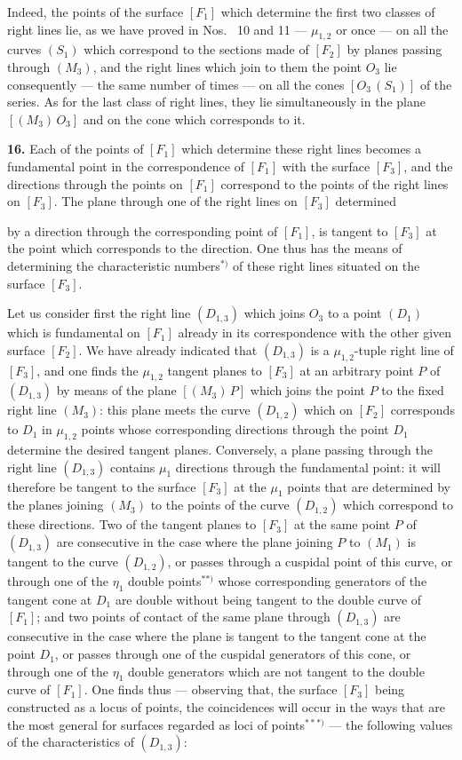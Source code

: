 \documentclass{article}
\begin{document}
Indeed, the points of the surface $[F_1]$ which determine the first two classes of right lines lie, as we have proved in Nos.~ 10 and 11 --- $\mu_{1, 2}$ or once --- on all the curves $(S_1)$ which correspond to the sections made of $[F_2]$ by planes passing through $(M_3)$, and the right lines which join to them the point $O_3$ lie consequently --- the same number of times --- on all the cones $[O_3\,(S_1)]$ of the series. As for the last class of right lines, they lie simultaneously in the plane $[(M_3)\,O_3]$ and on the cone which corresponds to it.

\textbf{16.} Each of the points of $[F_1]$ which determine these right lines becomes a fundamental point in the correspondence of $[F_1]$ with the surface $[F_3]$, and the directions through the points on $[F_1]$ correspond to the points of the right lines on $[F_3]$. The plane through one of the right lines on $[F_3]$ determined

by a direction through the corresponding point of $[F_1]$, is tangent to $[F_3]$ at the point which corresponds to the direction. One thus has the means of determining the characteristic numbers${}^{*)}$ of these right lines situated on the surface $[F_3]$.

Let us consider first the right line $(D_{1, 3})$ which joins $O_3$ to a point $(D_1)$ which is fundamental on $[F_1]$ already in its correspondence with the other given surface $[F_2]$. We have already indicated that $(D_{1, 3})$ is a $\mu_{1, 2}$-tuple right line of $[F_3]$, and one finds the $\mu_{1, 2}$ tangent planes to $[F_3]$ at an arbitrary point $P$ of $(D_{1, 3})$ by means of the plane $[(M_3)\,P]$ which joins the point $P$ to the fixed right line $(M_3)$: this plane meets the curve $(D_{1, 2})$ which on $[F_2]$ corresponds to $D_1$ in $\mu_{1, 2}$ points whose corresponding directions through the point $D_1$ determine the desired tangent planes. Conversely, a plane passing through the right line $(D_{1, 3})$ contains $\mu_1$ directions through the fundamental point: it will therefore be tangent to the surface $[F_3]$ at the $\mu_1$ points that are determined by the planes joining $(M_3)$ to the points of the curve $(D_{1, 2})$ which correspond to these directions. Two of the tangent planes to $[F_3]$ at the same point $P$ of $(D_{1, 3})$ are consecutive in the case where the plane joining $P$ to $(M_1)$ is tangent to the curve $(D_{1, 2})$, or passes through a cuspidal point of this curve, or through one of the $\eta_1$ double points${}^{**)}$ whose corresponding generators of the tangent cone at $D_1$ are double without being tangent to the double curve of $[F_1]$; and two points of contact of the same plane through $(D_{1, 3})$ are consecutive in the case where the plane is tangent to the tangent cone at the point $D_1$, or passes through one of the cuspidal generators of this cone, or through one of the $\eta_1$ double generators which are not tangent to the double curve of $[F_1]$. One finds thus --- observing that, the surface $[F_3]$ being constructed as a locus of points, the coincidences will occur in the ways that are the most general for surfaces regarded as loci of points${}^{***)}$ --- the following values of the characteristics of $(D_{1, 3})$:
\end{document}
